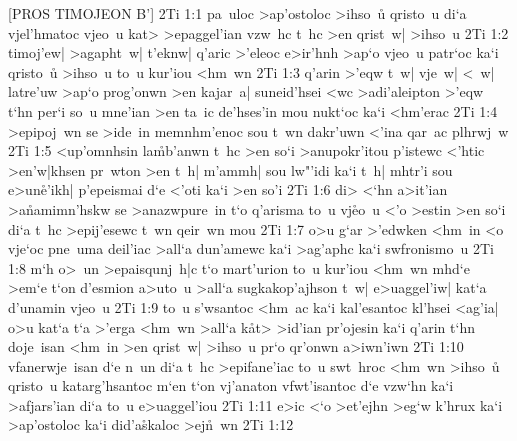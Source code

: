 [PROS TIMOJEON B']
\vs 2Ti 1:1
pa~uloc
>ap'ostoloc
>ihso~u\r{}
qristo~u
di`a
vjel'hmatoc
vjeo~u
kat>
>epaggel'ian
vzw~hc
t~hc
>en
qrist~w|
>ihso~u\bibvsend
\vs 2Ti 1:2
timoj'ew|
>agapht~w|
t'eknw|
q'aric
>'eleoc
e>ir'hnh
>ap`o
vjeo~u
patr`oc
ka`i
qristo~u\r{}
>ihso~u
to~u
kur'iou
<hm~wn\bibvsend
\vs 2Ti 1:3
q'arin
>'eqw
t~w|
vje~w|
<~w|
latre'uw
>ap`o
prog'onwn
>en
kajar~a|
suneid'hsei
<wc
>adi'aleipton
>'eqw
t`hn
per`i
so~u
mne'ian
>en
ta~ic
de'hses'in
mou
nukt`oc
ka`i
<hm'erac\bibvsend
\vs 2Ti 1:4
>epipoj~wn
se
>ide~in
memnhm'enoc
sou
t~wn
dakr'uwn
<'ina
qar~ac
plhrwj~w\bibvsend
\vs 2Ti 1:5
<up'omnhsin
la\r{m}b'anwn
t~hc
>en
so`i
>anupokr'itou
p'istewc
<'htic
>en'w|khsen
pr~wton
>en
t~h|
m'ammh|
sou
lw"'idi
ka`i
t~h|
mhtr'i
sou
e>un\r{e}'ikh|
p'epeismai
d`e
<'oti
ka`i
>en
so'i\bibvsend
\vs 2Ti 1:6
di>
<`hn
a>it'ian
>a\r{n}amimn'hskw
se
>anazwpure~in
t`o
q'arisma
to~u
vj\r{e}o~u
<'o
>estin
>en
so`i
di`a
t~hc
>epij'esewc
t~wn
qeir~wn
mou\bibvsend
\vs 2Ti 1:7
o>u
g`ar
>'edwken
<hm~in
<o
vje`oc
pne~uma
deil'iac
>all`a
dun'amewc
ka`i
>ag'aphc
ka`i
swfronismo~u\bibvsend
\vs 2Ti 1:8
m`h
o>~un
>epaisqunj~h|c
t`o
mart'urion
to~u
kur'iou
<hm~wn
mhd`e
>em`e
t`on
d'esmion
a>uto~u
>all`a
sugkakop'ajhson
t~w|
e>uaggel'iw|
kat`a
d'unamin
vjeo~u\bibvsend
\vs 2Ti 1:9
to~u
s'wsantoc
<hm~ac
ka`i
kal'esantoc
kl'hsei
<ag'ia|
o>u
kat`a
t`a
>'erga
<hm~wn
>all`a
k\r{a}t>
>id'ian
pr'ojesin
ka`i
q'arin
t`hn
doje~isan
<hm~in
>en
qrist~w|
>ihso~u
pr`o
qr'onwn
a>iwn'iwn\bibvsend
\vs 2Ti 1:10
vfanerwje~isan
d`e
n~un
di`a
t~hc
>epifane'iac
to~u
swt~hroc
<hm~wn
>ihso~u\r{}
qristo~u
katarg'hsantoc
m`en
t`on
vj'anaton
vfwt'isantoc
d`e
vzw`hn
ka`i
>afjars'ian
di`a
to~u
e>uaggel'iou\bibvsend
\vs 2Ti 1:11
e>ic
<`o
>et'ejhn
>eg`w
k'hrux
ka`i
>ap'ostoloc
ka`i
did'a\r{s}kaloc
>ej\r{n}~wn\bibvsend
{}
\vs 2Ti 1:12
